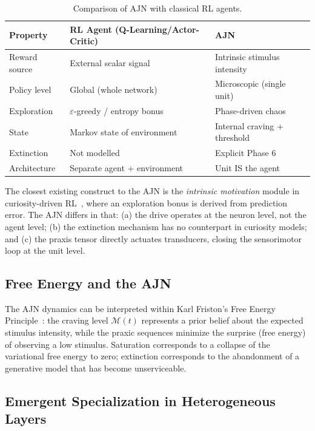 \documentclass[12pt,a4paper]{article}
\begin{document}
\begin{table}[h]
\centering
\caption{Comparison of AJN with classical RL agents.}
\label{tab:comparison}
\begin{tabular}{@{}lll@{}}
\toprule
\textbf{Property} & \textbf{RL Agent (Q-Learning/Actor-Critic)}
                  & \textbf{AJN} \\
\midrule
Reward source & External scalar signal & Intrinsic stimulus intensity \\
Policy level  & Global (whole network) & Microscopic (single unit) \\
Exploration   & $\varepsilon$-greedy / entropy bonus & Phase-driven chaos \\
State        & Markov state of environment & Internal craving + threshold \\
Extinction   & Not modelled & Explicit Phase 6 \\
Architecture & Separate agent + environment & Unit IS the agent \\
\bottomrule
\end{tabular}
\end{table}

The closest existing construct to the AJN is the \textit{intrinsic motivation}
module in curiosity-driven RL~\cite{pathak2017curiosity}, where an exploration
bonus is derived from prediction error. The AJN differs in that: (a) the drive
operates at the neuron level, not the agent level; (b) the extinction mechanism
has no counterpart in curiosity models; and (c) the praxis tensor directly
actuates transducers, closing the sensorimotor loop at the unit level.

\subsection{Free Energy and the AJN}

The AJN dynamics can be interpreted within Karl Friston's Free Energy
Principle~\cite{friston2010fep}: the craving level $\mathcal{M}(t)$ represents
a prior belief about the expected stimulus intensity, while the praxic sequences
minimize the surprise (free energy) of observing a low stimulus. Saturation
corresponds to a collapse of the variational free energy to zero; extinction
corresponds to the abandonment of a generative model that has become
unserviceable.

\subsection{Emergent Specialization in Heterogeneous Layers}
\end{document}
